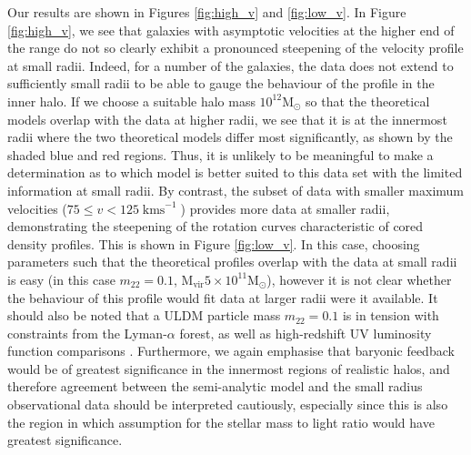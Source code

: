 \documentclass{pasa}%
\begin{document}
Our results are shown in Figures \ref{fig:high_v} and \ref{fig:low_v}. In Figure \ref{fig:high_v}, we see that galaxies with asymptotic velocities at the higher end of the range do not so clearly exhibit a pronounced steepening of the velocity profile at small radii. Indeed, for a number of the galaxies, the data does not extend to sufficiently small radii to be able to gauge the behaviour of the profile in the inner halo. If we choose a suitable halo mass $10^{12} \mathrm{M}_{\odot}$ so that the theoretical models overlap with the data at higher radii, we see that it is at the innermost radii where the two theoretical models differ most significantly, as shown by the shaded blue and red regions. Thus, it is unlikely to be meaningful to make a determination as to which model is better suited to this data set with the limited information at small radii. By contrast, the subset of data with smaller maximum velocities ($75 \leq v < 125\operatorname{kms}^{-1}$) provides more data at smaller radii, demonstrating the steepening of the rotation curves characteristic of cored density profiles. This is shown in Figure \ref{fig:low_v}. In this case, choosing parameters such that the theoretical profiles overlap with the data at small radii is easy (in this case $m_{22} = 0.1$, $\mathrm{M}_{\mathrm{vir}}5\times10^{11} \mathrm{M}_{\odot}$), however it is not clear whether the behaviour of this profile would fit data at larger radii were it available. It should also be noted that a ULDM particle mass $m_{22} = 0.1$ is in tension with constraints from the Lyman-$\alpha$ forest, as well as high-redshift UV luminosity function comparisons \cite{Amendola:2005ad, Bozek:2014uqa, Armengaud:2017nkf, Ni:2019qfa, Nebrin:2018vqt}. Furthermore, we again emphasise that baryonic feedback would be of greatest significance in the innermost regions of realistic halos, and therefore agreement between the semi-analytic model and the small radius observational data should be interpreted cautiously, especially since this is also the region in which assumption for the stellar mass to light ratio would have greatest significance.  
\end{document}
